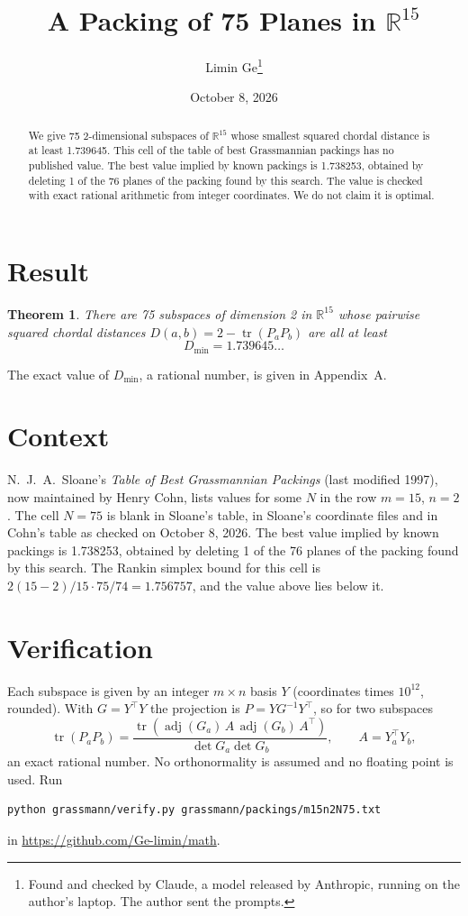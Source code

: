 \documentclass[11pt,a4paper]{article}
\title{A Packing of 75 Planes in $\mathbb{R}^{15}$}
\author{Limin Ge\thanks{Found and checked by Claude, a model released by Anthropic, running on the author's laptop. The author sent the prompts.}}
\date{October 8, 2026}
\newtheorem*{theorem}{Theorem}
\begin{document}
\maketitle
\begin{abstract}
We give 75 2-dimensional subspaces of $\mathbb{R}^{15}$ whose smallest squared chordal distance is at least 1.739645. This cell of the table of best Grassmannian packings has no published value. The best value implied by known packings is 1.738253, obtained by deleting 1 of the 76 planes of the packing found by this search. The value is checked with exact rational arithmetic from integer coordinates. We do not claim it is optimal.
\end{abstract}

\section{Result}
\begin{theorem}
There are 75 subspaces of dimension 2 in $\mathbb{R}^{15}$ whose pairwise squared chordal distances $D(a,b) = 2 - \operatorname{tr}(P_aP_b)$ are all at least
\[ D_{\min} = 1.739645\ldots \]
\end{theorem}
The exact value of $D_{\min}$, a rational number, is given in Appendix~A.


\section{Context}
N.~J.~A.~Sloane's \emph{Table of Best Grassmannian Packings} (last modified 1997), now maintained by Henry Cohn, lists values for some $N$ in the row $m=15$, $n=2$. The cell $N=75$ is blank in Sloane's table, in Sloane's coordinate files and in Cohn's table as checked on October 8, 2026. The best value implied by known packings is 1.738253, obtained by deleting 1 of the 76 planes of the packing found by this search. The Rankin simplex bound for this cell is $2(15-2)/15\cdot 75/74 = 1.756757$, and the value above lies below it.


\section{Verification}
Each subspace is given by an integer $m\times n$ basis $Y$ (coordinates times $10^{12}$, rounded). With $G=Y^\top Y$ the projection is $P=YG^{-1}Y^\top$, so for two subspaces
\[ \operatorname{tr}(P_aP_b)=\frac{\operatorname{tr}(\operatorname{adj}(G_a)\,A\,\operatorname{adj}(G_b)\,A^\top)}{\det G_a\det G_b},\qquad A=Y_a^\top Y_b, \]
an exact rational number. No orthonormality is assumed and no floating point is used. Run
\begin{verbatim}
python grassmann/verify.py grassmann/packings/m15n2N75.txt
\end{verbatim}
in \url{https://github.com/Ge-limin/math}.
\end{document}
